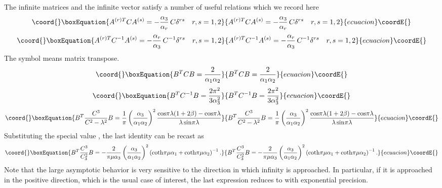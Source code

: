 \documentclass[a4paper,12pt]{article}
\begin{document}
The infinite matrices \coordHE{} and the infinite vector \coordHE{}
satisfy a number of useful relations which we record here
\begin{equation}\coord{}\boxEquation{
A^{(r) T} C A^{(s)} = - {\alpha_3 \over \alpha_r}\, C \delta^{rs}
\quad r,s = 1,2
}{
A^{(r) T} C A^{(s)} = - {\alpha_3 \over \alpha_r}\, C \delta^{rs}
\quad r,s = 1,2
}{ecuacion}\coordE{}\end{equation}
\begin{equation}\coord{}\boxEquation{
A^{(r) T} C^{-1} A^{(s)} = - {\alpha_r \over \alpha_3}\, C^{-1}
\delta^{rs} \quad r,s = 1,2
}{
A^{(r) T} C^{-1} A^{(s)} = - {\alpha_r \over \alpha_3}\, C^{-1}
\delta^{rs} \quad r,s = 1,2
}{ecuacion}\coordE{}\end{equation}
The symbol \coordHE{} means matrix transpose.
\begin{equation}\coord{}\boxEquation{
B^T C B = {2\over \alpha_1 \alpha_2}
}{
B^T C B = {2\over \alpha_1 \alpha_2}
}{ecuacion}\coordE{}\end{equation}
\begin{equation}\coord{}\boxEquation{
B^T C^{-1} B = {2 \pi^2 \over 3 \alpha_3^2}
}{
B^T C^{-1} B = {2 \pi^2 \over 3 \alpha_3^2}
}{ecuacion}\coordE{}\end{equation}
\begin{equation}\coord{}\boxEquation{
B^T {C^3 \over C^2 -\lambda^2} B = {1 \over \pi} \left( {\alpha_3
\over \alpha_1 \alpha_2} \right)^2 {{\rm cos} \pi \lambda
(1+2\beta) - {\rm cos} \pi \lambda \over \lambda\, {\rm sin} \pi
\lambda}
}{
B^T {C^3 \over C^2 -\lambda^2} B = {1 \over \pi} \left( {\alpha_3
\over \alpha_1 \alpha_2} \right)^2 {{\rm cos} \pi \lambda
(1+2\beta) - {\rm cos} \pi \lambda \over \lambda\, {\rm sin} \pi
\lambda}
}{ecuacion}\coordE{}\end{equation}
Substituting the special value \coordHE{}, the
last identity can be recast as
\begin{equation}\coord{}\boxEquation{
B^T {C^3 \over C_3^2} B = -{2 \over \pi\mu\alpha_3} \left(
{\alpha_3 \over \alpha_1 \alpha_2} \right)^2\left( {\rm coth} \pi
\mu \alpha_1 + {\rm coth} \pi \mu \alpha_2 \right)^{-1}.
}{
B^T {C^3 \over C_3^2} B = -{2 \over \pi\mu\alpha_3} \left(
{\alpha_3 \over \alpha_1 \alpha_2} \right)^2\left( {\rm coth} \pi
\mu \alpha_1 + {\rm coth} \pi \mu \alpha_2 \right)^{-1}.
}{ecuacion}\coordE{}\end{equation}
Note that the large \myHighlight{$\mu$}\coordHE{} asymptotic behavior is very sensitive to
the direction in which infinity is approached. In particular, if
it is approached in the positive direction, which is the usual
case of interest, the last expression reduces to \coordHE{} with exponential precision.
\end{document}
